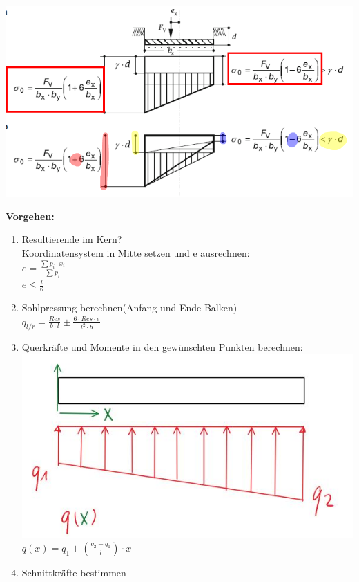 \begin{multicols}{2}
	\includegraphics[width=\linewidth]{images/Flachfun6Sptrapez.PNG}
	
	\textbf{Vorgehen:}
	
	\begin{enumerate}
		\item 
		Resultierende im Kern?\\Koordinatensystem in Mitte setzen und e ausrechnen:\\
		$e=\frac{\sum p_i\cdot x_i}{\sum p_i}$\\
		$e\leq \frac{l}{6}$
		
		\item
		Sohlpressung berechnen(Anfang und Ende Balken)\\
		$q_{l/r}=\frac{Res}{b\cdot l}\pm\frac{6\cdot Res\cdot e}{l^2\cdot b} $
		
		\item 
		Querkräfte und Momente in den gewünschten Punkten berechnen:\\
		\includegraphics[width=0.7\linewidth]{images/Sohldruck}\\
		$q(x)=q_1+(\frac{q_2-q_1}{l})\cdot x$
		\item 
		Schnittkräfte bestimmen	
	\end{enumerate}
	

\end{multicols}
